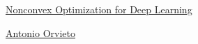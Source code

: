 \documentclass[11pt]{article}
\begin{document}
	\kaishu 
	\setcounter{section}{0}
	\begin{center}
		{\LARGE  \href{https://institute-tue.ellis.eu/en/lecture-deep-optimization}{Nonconvex Optimization for Deep Learning}}
		
		
		{\large \href{http://orvi.altervista.org/}{Antonio Orvieto}}
	\end{center}
\setcounter{page}{1}



\vspace{-0.5cm}
\end{document}
